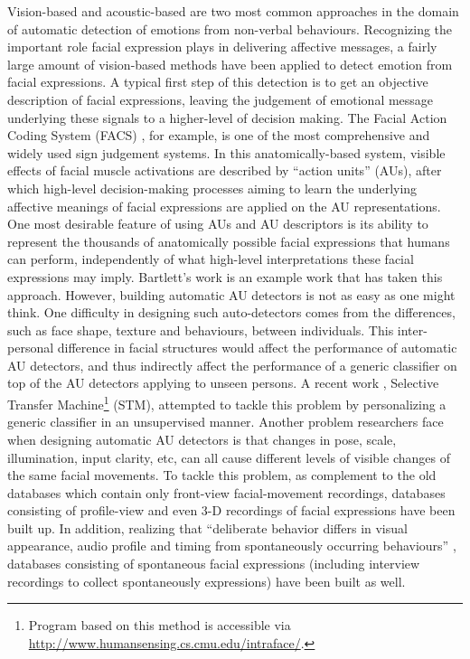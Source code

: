 Vision-based and acoustic-based are two most common approaches in the domain of automatic detection of emotions from non-verbal behaviours. Recognizing the important role facial expression plays in delivering affective messages, a fairly large amount of vision-based methods have been applied to detect emotion from facial expressions. A typical first step of this detection is to get an objective description of facial expressions, leaving the judgement of emotional message underlying these signals to a higher-level of decision making. The Facial Action Coding System (FACS) \cite{ekm02}, for example, is one of the most comprehensive and widely used sign judgement systems. In this anatomically-based system, visible effects of facial muscle activations are described by ``action units'' (AUs), after which high-level decision-making processes aiming to learn the underlying affective meanings of facial expressions are applied on the AU representations. One most desirable feature of using AUs and AU descriptors is its ability to represent the thousands of anatomically possible facial expressions that humans can perform, independently of what high-level interpretations these facial expressions may imply. Bartlett's work \cite{bartlett2005recognizing} is an example work that has taken this approach. However, building automatic AU detectors is not as easy as one might think. One difficulty in designing such auto-detectors comes from the differences, such as face shape, texture and behaviours, between individuals. This inter-personal difference in facial structures would affect the performance of automatic AU detectors, and thus indirectly affect the performance of a generic classifier on top of the AU detectors applying to unseen persons. A recent work \cite{chu2013selective}, Selective Transfer Machine\footnote{Program based on this method is accessible via \url{http://www.humansensing.cs.cmu.edu/intraface/}.} (STM), attempted to tackle this problem by personalizing a generic classifier in an unsupervised manner. Another problem researchers face when designing automatic AU detectors is that changes in pose, scale, illumination, input clarity, etc, can all cause different levels of visible changes of the same facial movements. To tackle this problem, as complement to the old databases which contain only front-view facial-movement recordings, databases consisting of profile-view \cite{pantic2005web} and even 3-D recordings \cite{yin20063d} of facial expressions have been built up. In addition, realizing that ``deliberate behavior differs in visual appearance, audio profile and timing from spontaneously occurring behaviours'' \cite{zeng2009survey}, databases consisting of spontaneous facial expressions (including interview recordings to collect spontaneously expressions) have been built as well.

